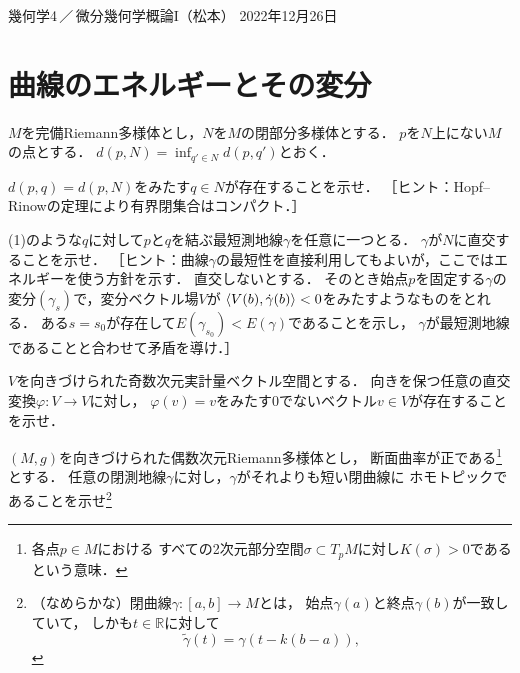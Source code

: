 \documentclass[uplatex,dvipdfmx,fontsize=12pt,jafontsize=11pt,line_length=42zw,number_of_lines=36,hanging_punctuation]{jlreq}
\begin{document}
\begin{flushleft}
	幾何学4\,／\,微分幾何学概論I（松本）
	\hfill
	2022年12月26日
\end{flushleft}
\setcounter{section}{10}
\section{曲線のエネルギーとその変分}

\begin{enumerate-problems}
	\item[11.1]
		$M$を完備Riemann多様体とし，$N$を$M$の閉部分多様体とする．
		$p$を$N$上にない$M$の点とする．
		$d(p,N)=\inf_{q'\in N}d(p,q')$とおく．
		\begin{enumerate-subproblems}
			\item
				$d(p,q)=d(p,N)$をみたす$q\in N$が存在することを示せ．
				［ヒント：Hopf--Rinowの定理により有界閉集合はコンパクト．］
			\item
				(1)のような$q$に対して$p$と$q$を結ぶ最短測地線$\gamma$を任意に一つとる．
				$\gamma$が$N$に直交することを示せ．
				［ヒント：曲線$\gamma$の最短性を直接利用してもよいが，ここではエネルギーを使う方針を示す．
				直交しないとする．
				そのとき始点$p$を固定する$\gamma$の変分$(\gamma_s)$で，変分ベクトル場$V$が
				$\braket{V(b),\dot{\gamma}(b)}<0$をみたすようなものをとれる．
				ある$s=s_0$が存在して$E(\gamma_{s_0})<E(\gamma)$であることを示し，
				$\gamma$が最短測地線であることと合わせて矛盾を導け．］
		\end{enumerate-subproblems}
	\item[11.2]\phantom{}
		\begin{enumerate-subproblems}
			\item\vspace{-\baselineskip}
				$V$を向きづけられた奇数次元実計量ベクトル空間とする．
				向きを保つ任意の直交変換$\varphi\colon V\to V$に対し，
				$\varphi(v)=v$をみたす$0$でないベクトル$v\in V$が存在することを示せ．
			\item
				$(M,g)$を向きづけられた偶数次元Riemann多様体とし，
				断面曲率が正である\footnote{各点$p\in M$における
				すべての2次元部分空間$\sigma\subset T_pM$に対し$K(\sigma)>0$であるという意味．}とする．
				任意の閉測地線$\gamma$に対し，$\gamma$がそれよりも短い閉曲線に
				ホモトピックであることを示せ\footnote{（なめらかな）閉曲線$\gamma\colon[a,b]\to M$とは，
				始点$\gamma(a)$と終点$\gamma(b)$が一致していて，
				しかも$t\in\mathbb{R}$に対して
				\begin{equation}
					\tilde{\gamma}(t)=\gamma(t-k(b-a)),

\end{equation}}
\end{enumerate-subproblems}
\end{enumerate-problems}
\end{document}
